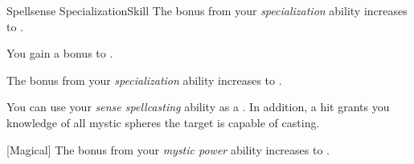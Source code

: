 \begin{feat}{Spellsense Specialization}{Skill}
         The bonus from your \textit{specialization} ability increases to .

         You gain a  bonus to  .

         The bonus from your \textit{specialization} ability increases to .

         You can use your \textit{sense spellcasting} ability as a .
        In addition, a hit grants you knowledge of all mystic spheres the target is capable of casting.

        [Magical] The bonus from your \textit{mystic power} ability increases to .
    \end{feat}

